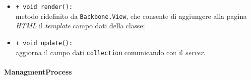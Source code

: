 \begin{flushleft}
\begin{itemize}
\begin{sloppypar}
\begin{itemize}
\item \texttt{+ void render():}\\ metodo ridefinito da \texttt{Backbone.View}, che consente di aggiungere alla pagina \textit{HTML} il \textit{template} campo dati della classe;
\item \texttt{+ void update():}\\ aggiorna il campo dati \texttt{collection} comunicando con il \textit{server}.
\end{itemize}
\end{sloppypar}
\end{itemize}
\end{flushleft}

\paragraph{ManagmentProcess}
\label{managementProcessU}
